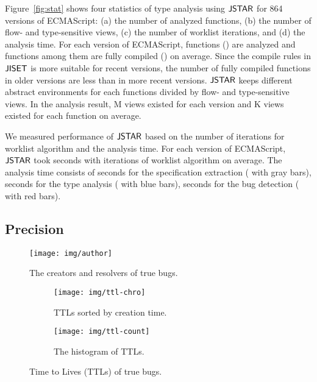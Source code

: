 Figure~\ref{fig:stat} shows four statistics of type analysis using $\tool$ for
864 versions of ECMAScript: (a) the number of analyzed functions, (b) the number
of flow- and type-sensitive views, (c) the number of worklist iterations, and
(d) the analysis time.  For each version of ECMAScript, 
functions () are analyzed and  functions among them
are fully compiled () on average.  Since the compile rules in
$\jiset$ is more suitable for recent versions, the number of fully compiled
functions in older versions are less than in more recent versions.  $\tool$
keeps different abstract environments for each functions divided by flow- and
type-sensitive views.  In the analysis result, M views existed for
each version and K views existed for each function on average.

We measured performance of $\tool$ based on the number of iterations for
worklist algorithm and the analysis time.  For each version of ECMAScript,
$\tool$ took  seconds with  iterations of worklist
algorithm on average.  The analysis time consists of  seconds for
the specification extraction ( with gray bars), 
seconds for the type analysis ( with blue bars), 
seconds for the bug detection ( with red bars).


\subsection{Precision}\label{sec:precision}

\begin{figure}
  \centering
  \texttt{[image: img/author]}
  \caption{The creators and resolvers of true bugs.}
  \label{fig:author}
  \vspace*{-1.5em}
\end{figure}

\begin{figure}
  \centering
  \begin{subfigure}[b]{0.24\textwidth}
    \texttt{[image: img/ttl-chro]}
    \caption{TTLs sorted by creation time.}
  \end{subfigure}
  \begin{subfigure}[b]{0.24\textwidth}
    \texttt{[image: img/ttl-count]}
    \caption{The histogram of TTLs.}
  \end{subfigure}
  \caption{Time to Lives (TTLs) of true bugs.}
  \vspace*{-1.5em}
  \label{fig:ttl}
\end{figure}

